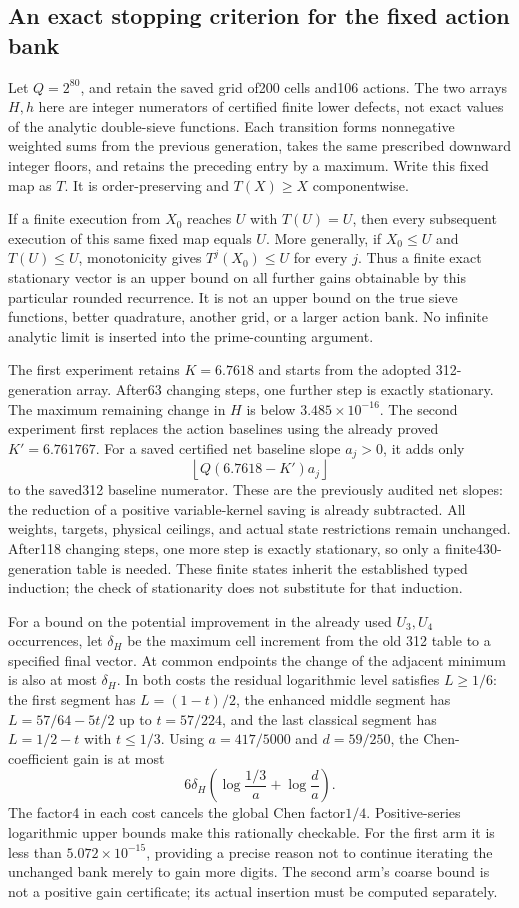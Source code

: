 \subsection{An exact stopping criterion for the fixed action bank}
Let $Q=2^{80}$, and retain the saved grid of200 cells and106 actions.
The two arrays $H,h$ here are integer numerators of certified finite
lower defects, not exact values of the analytic double-sieve functions.
Each transition forms nonnegative weighted sums from the previous
generation, takes the same prescribed downward integer floors, and
retains the preceding entry by a maximum. Write this fixed map as $T$.
It is order-preserving and $T(X)\ge X$ componentwise.

If a finite execution from $X_0$ reaches $U$ with $T(U)=U$, then every
subsequent execution of this same fixed map equals $U$. More generally,
if $X_0\le U$ and $T(U)\le U$, monotonicity gives $T^j(X_0)\le U$ for
every $j$. Thus a finite exact stationary vector is an upper bound on
all further gains obtainable by this particular rounded recurrence.
It is not an upper bound on the true sieve functions, better quadrature,
another grid, or a larger action bank. No infinite analytic limit is
inserted into the prime-counting argument.

The first experiment retains $K=6.7618$ and starts from the adopted
312-generation array. After63 changing steps, one further step is
exactly stationary. The maximum remaining change in $H$ is below
$3.485\times10^{-16}$. The second experiment first replaces the action
baselines using the already proved $K'=6.761767$. For a saved certified
net baseline slope $a_j>0$, it adds only
\[
 \left\lfloor Q(6.7618-K')a_j\right\rfloor
\]
to the saved312 baseline numerator. These are the previously audited
net slopes: the reduction of a positive variable-kernel saving is
already subtracted. All weights, targets, physical ceilings, and actual
state restrictions remain unchanged. After118 changing steps, one
more step is exactly stationary, so only a finite430-generation table
is needed. These finite states inherit the established typed induction;
the check of stationarity does not substitute for that induction.

For a bound on the potential improvement in the already used $U_3,U_4$
occurrences, let $\delta_H$ be the maximum cell increment from the old
312 table to a specified final vector. At common endpoints the change
of the adjacent minimum is also at most $\delta_H$.
In both costs the residual logarithmic level satisfies $L\ge1/6$:
the first segment has $L=(1-t)/2$, the enhanced middle segment has
$L=57/64-5t/2$ up to $t=57/224$, and the last classical segment has
$L=1/2-t$ with $t\le1/3$.
Using $a=417/5000$ and $d=59/250$, the Chen-coefficient gain is at most
\[
 6\delta_H\left(\log\frac{1/3}{a}+\log\frac d a\right).
\]
The factor4 in each cost cancels the global Chen factor$1/4$.
Positive-series logarithmic upper bounds make this rationally checkable.
For the first arm it is less than $5.072\times10^{-15}$, providing a
precise reason not to continue iterating the unchanged bank merely to
gain more digits. The second arm's coarse bound is not a positive
gain certificate; its actual insertion must be computed separately.

